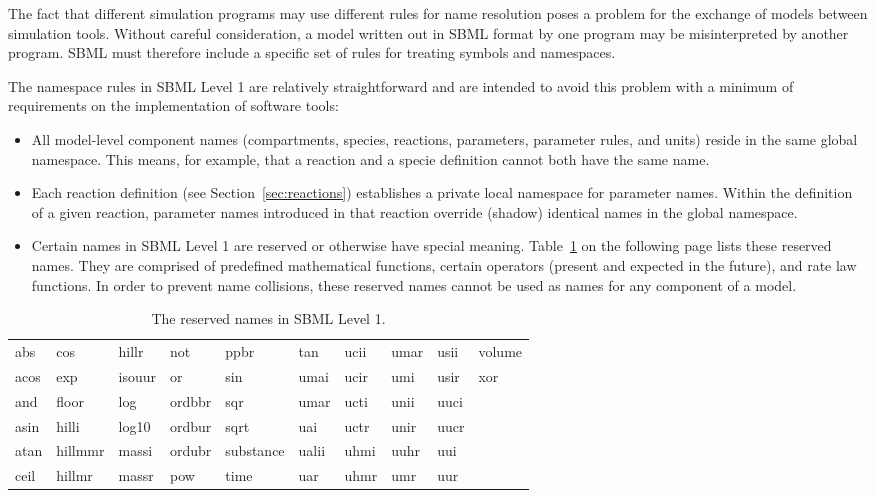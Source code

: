 \documentclass[10pt]{cekarticle}
\begin{document}
The fact that different simulation programs may use different rules for
name resolution poses a problem for the exchange of models between
simulation tools.  Without careful consideration, a model written out in
SBML format by one program may be misinterpreted by another program.  SBML
must therefore include a specific set of rules for treating symbols and
namespaces.

The namespace rules in SBML Level 1 are relatively straightforward and are
intended to avoid this problem with a minimum of requirements on the
implementation of software tools:
\begin{itemize}
  
\item All model-level component names (compartments, species, reactions,
  parameters, parameter rules, and units) reside in the same global
  namespace.  This means, for example, that a reaction and a specie
  definition cannot both have the same name.
  
\item Each reaction definition (see Section~\ref{sec:reactions})
  establishes a private local namespace for parameter names.  Within the
  definition of a given reaction, parameter names introduced in that
  reaction override (shadow) identical names in the global namespace.
  
\item Certain names in SBML Level 1 are reserved or otherwise have special
  meaning.  Table~\ref{tab:reserved-names} on the following page lists
  these reserved names.  They are comprised of predefined mathematical
  functions, certain operators (present and expected in the future), and
  rate law functions.  In order to prevent name collisions, these reserved
  names cannot be used as names for any component of a model.

\end{itemize}  

\begin{table}[tbh]
  \vspace*{5pt}
  \centering
  \ttfamily
  \begin{tabular}{llllllllll}
    \toprule
    abs	   & cos	& hillr   & not     & ppbr	& tan	& ucii & umar  & usii  & volume\\
    acos   & exp	& isouur  & or 	    & sin	& umai	& ucir & umi   & usir  & xor\\
    and    & floor	& log	  & ordbbr  & sqr	& umar	& ucti & unii  & uuci \\
    asin   & hilli	& log10	  & ordbur  & sqrt	& uai	& uctr & unir  & uucr \\
    atan   & hillmmr	& massi	  & ordubr  & substance	& ualii	& uhmi & uuhr  & uui \\
    ceil   & hillmr	& massr	  & pow     & time	& uar	& uhmr & umr   & uur \\
    \bottomrule
  \end{tabular}
  \caption{The reserved names in SBML Level 1.}
  \label{tab:reserved-names}
\end{table}
\end{document}
